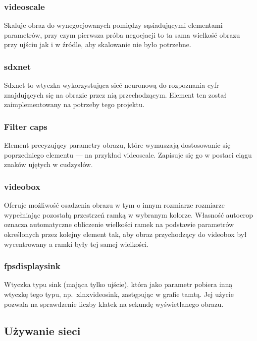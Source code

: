 \documentclass[12pt, oneside, a4paper]{article}
\begin{document}
\subsubsection{videoscale}
Skaluje obraz do wynegocjowanych pomiędzy sąsiadującymi elementami
parametrów, przy czym pierwsza próba negocjacji to ta sama wielkość
obrazu przy ujściu jak i w źródle, aby skalowanie nie było potrzebne.

\subsubsection{sdxnet}
Sdxnet to wtyczka wykorzystująca sieć neuronową do rozpoznania cyfr
znajdujących się na obrazie przez nią przechodzącym. Element ten został
zaimplementowany na potrzeby tego projektu.

\subsubsection{Filter caps}
Element precyzujący parametry obrazu, które wymuszają
dostosowanie się poprzedniego elementu --- na przykład videoscale.
Zapisuje się go w postaci ciągu znaków ujętych w cudzysłów.

\subsubsection{videobox}
Oferuje możliwość osadzenia obrazu w tym o innym rozmiarze
rozmiarze wypełniając pozostałą przestrzeń ramką
w wybranym kolorze. Własność autocrop oznacza automatyczne obliczenie
wielkości ramek na podstawie parametrów określonych przez kolejny element tak,
aby obraz przychodzący do videobox był wycentrowany a ramki
były tej samej wielkości.

\subsubsection{fpsdisplaysink}
Wtyczka typu sink (mająca tylko ujście), która jako parametr
pobiera inną wtyczkę tego typu, np.~xlnxvideosink,
zastępując w grafie tamtą.
Jej użycie pozwala na sprawdzenie liczby klatek na sekundę
wyświetlanego obrazu.



\subsection{Używanie sieci}
\end{document}
